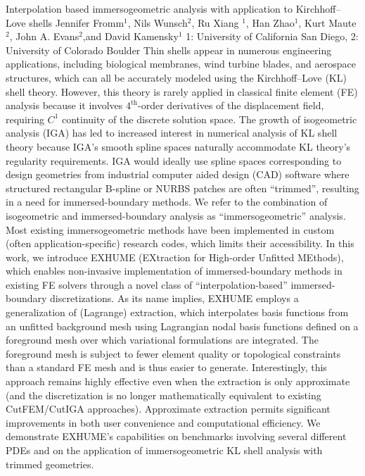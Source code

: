 \vspace{1.5ex}
\abs
{Interpolation based immersogeometric analysis with application to Kirchhoff--Love shells}
{Jennifer Fromm$^{1}$, Nils Wunsch$^{2}$,  Ru Xiang $^{1}$, Han Zhao$^{1}$, Kurt Maute$^{2}$, John A. Evans$^{2}$,and David Kamensky$^{1}$}
{1: University of California San Diego, 2: University of Colorado Boulder}
{Thin shells appear in numerous engineering applications, including biological membranes, wind turbine blades, and aerospace structures, which can all be accurately modeled using the Kirchhoff--Love (KL) shell theory.
 However, this theory is rarely applied in classical finite element (FE) analysis because it involves $4^{\text{th}}$-order derivatives of the displacement field, requiring $C^1$ continuity of the discrete solution space.
 The growth of isogeometric analysis (IGA) has led to increased interest in numerical analysis of KL shell theory  because IGA's smooth spline spaces naturally accommodate KL theory's regularity requirements.
 IGA would ideally use spline spaces corresponding to design geometries from industrial computer aided design (CAD) software where structured rectangular B-spline or NURBS patches are often ``trimmed'', resulting in a need for immersed-boundary methods. 
 We refer to the combination of isogeometric and immersed-boundary analysis as ``immersogeometric'' analysis. 
 Most existing immersogeometric methods have been implemented in custom (often application-specific) research codes, which limits their accessibility.
 In this work, we introduce EXHUME (EXtraction for High-order Unfitted MEthods), which enables non-invasive implementation of immersed-boundary methods in existing FE solvers through a novel class of ``interpolation-based'' immersed-boundary discretizations.
 As its name implies, EXHUME employs a generalization of (Lagrange) extraction, which interpolates basis functions from an unfitted background mesh using Lagrangian nodal basis functions defined on a foreground mesh over which variational formulations are integrated. 
 The foreground mesh is subject to fewer element quality or topological constraints than a standard FE mesh and is thus easier to generate. 
 Interestingly, this approach remains highly effective even when the extraction is only approximate (and the discretization is no longer mathematically equivalent to existing CutFEM/CutIGA approaches).  Approximate extraction permits significant improvements in both user convenience and computational efficiency. 
 We demonstrate EXHUME's capabilities on benchmarks involving several different PDEs and on the application of immersogeometric KL shell analysis with trimmed geometries.}


